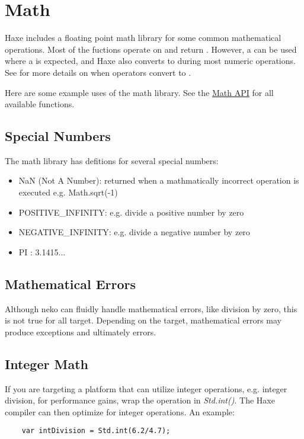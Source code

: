 \documentclass{haxe}
\begin{document}
\section{Math}
\label{std-math}

Haxe includes a floating point math library for some common mathematical operations.  Most of the fuctions operate on and return .  However, a  can be used where a  is expected, and Haxe also converts  to  during most numeric operations.  See  for more details on when operators convert  to .

Here are some example uses of the math library.  See the \href{http://api.haxe.org/Math.html}{Math API} for all available functions.


\subsection{Special Numbers}
\label{std-math-special-numbers}
The math library has defitions for several special numbers:
\begin{itemize}
	\item NaN (Not A Number): returned when a mathmatically incorrect operation is executed e.g. Math.sqrt(-1)
	\item POSITIVE_INFINITY: e.g. divide a positive number by zero
	\item NEGATIVE_INFINITY: e.g. divide a negative number by zero
	\item PI : 3.1415...
\end{itemize}

\subsection{Mathematical Errors}
\label{std-math-mathematical-errors}
Although neko can fluidly handle mathematical errors, like division by zero, this is not true for all target.  Depending on the target, mathematical errors may produce exceptions and ultimately errors.

\subsection{Integer Math}
\label{std-math-integer-math}
If you are targeting a platform that can utilize integer operations, e.g. integer division, for performance gains, wrap the operation in \emph{Std.int()}.  The Haxe compiler can then optimize for integer operations.  An example:
\begin{lstlisting}
	var intDivision = Std.int(6.2/4.7);
\end{lstlisting}
\end{document}
